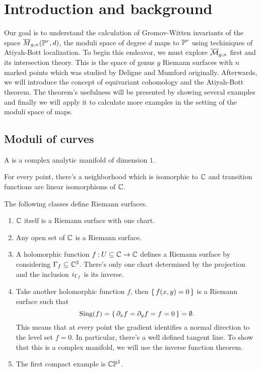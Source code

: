 \documentclass[12pt]{memoir}
\author{\nauthor}
\begin{document}
\chapter{Introduction and background}

Our goal is to understand the calculation of Gromov-Witten invariants of the space $\overline M_{g,n}(\mathbb{P}^r,d)$, the moduli space of degree $d$ maps to $\mathbb{P}^r$ using techiniques of Atiyah-Bott localization. To begin this endeavor, we must explore $\overline{\mathcal{M}}_{g,n}$ first and its intersection theory. This is the space of genus $g$ Riemann surfaces with $n$ marked points which was studied by Deligne and Mumford originally. Afterwards, we will introduce the concept of equivariant cohomology and the Atiyah-Bott theorem. The theorem's usefulness will be presented by showing several examples and finally we will apply it to calculate more examples in the setting of the moduli space of maps.

\section{Moduli of curves}

\begin{Def}
    A  is a complex analytic manifold of dimension $1$. 
\end{Def}
    
For every point, there's a neighborhood which is isomorphic to $\mathbb{C}$ and transition functions are linear isomorphisms of $\mathbb{C}$.
    
\begin{Ex}
        The following classes define Riemann surfaces.
        \begin{enumerate}
        \item $\mathbb{C}$ itself is a Riemann surface with one chart.
        \item Any open set of $\mathbb{C}$ is a Riemann surface.
        \item A holomorphic function $f\mathbin{:} U\subseteq\mathbb{C}\to\mathbb{C}$ defines a Riemann surface by considering $\Gamma_f\subseteq\mathbb{C}^2$. There's only one chart determined by the projection and the inclusion $i_{\Gamma_f}$ is its inverse.
        \item Take another holomorphic function $f$, then $\{\,f(x,y)=0\,\}$ is a Riemann surface such that 
        $$\text{Sing}(f)=\{\,\partial_xf=\partial_yf=f=0\,\}=\emptyset.$$
        This means that at every point the gradient identifies a normal direction to the level set $f=0$. In particular, there's a well defined tangent line. To show that this is a complex manifold, we will use the inverse function theorem. 
        \item The first compact example is $\mathbb{CP}^1$.
        \end{enumerate}
\end{Ex}
\end{document}
